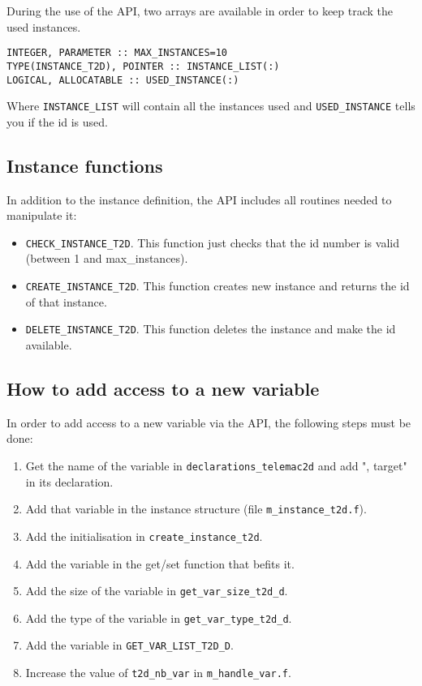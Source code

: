 During the use of the API, two arrays are available in order to keep track the
used instances.
\begin{lstlisting}
INTEGER, PARAMETER :: MAX_INSTANCES=10
TYPE(INSTANCE_T2D), POINTER :: INSTANCE_LIST(:)
LOGICAL, ALLOCATABLE :: USED_INSTANCE(:)
\end{lstlisting}

Where \verb!INSTANCE_LIST! will contain all the instances used and
\verb!USED_INSTANCE! tells you if the id is used.

\subsection{Instance functions}

In addition to the instance definition, the API includes all routines needed to
manipulate it:

\begin{itemize}
\item \verb!CHECK_INSTANCE_T2D!. This function just checks that the id number
  is valid (between 1 and max\_instances).
\item \verb!CREATE_INSTANCE_T2D!. This function creates new instance and
  returns the id of that instance.
\item \verb!DELETE_INSTANCE_T2D!. This function deletes the instance and make
  the id available.
\end{itemize}
%
\subsection{How to add access to a new variable}
\label{var_add}
%
In order to add access to a new variable via the API, the following steps must
be done:

\begin{enumerate}
\item Get the name of the variable in \verb!declarations_telemac2d! and add ",
  target" in its declaration.
\item Add that variable in the instance structure (file
  \verb!m_instance_t2d.f!).
\item Add the initialisation in \verb!create_instance_t2d!.
\item Add the variable in the get/set function that befits it.
\item Add the size of the variable in \verb!get_var_size_t2d_d!.
\item Add the type of the variable in \verb!get_var_type_t2d_d!.
\item Add the variable in \verb!GET_VAR_LIST_T2D_D!.
\item Increase the value of \verb!t2d_nb_var! in \verb!m_handle_var.f!.
\end{enumerate}

